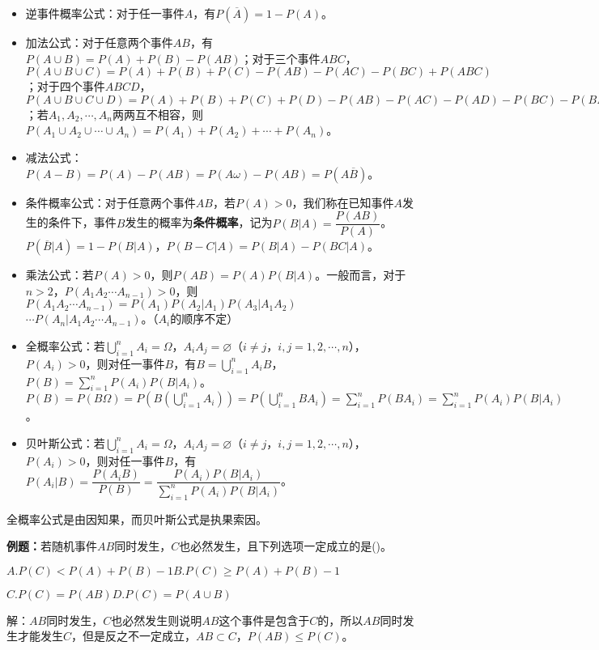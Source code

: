 \documentclass[UTF8, 12pt]{ctexart}
\begin{document}
\begin{itemize}
    \item 逆事件概率公式：对于任一事件$A$，有$P(\overline{A})=1-P(A)$。
    \item 加法公式：对于任意两个事件$AB$，有$P(A\cup B)=P(A)+P(B)-P(AB)$；对于三个事件$ABC$，$P(A\cup B\cup C)=P(A)+P(B)+P(C)-P(AB)-P(AC)-P(BC)+P(ABC)$；对于四个事件$ABCD$，$P(A\cup B\cup C\cup D)=P(A)+P(B)+P(C)+P(D)-P(AB)-P(AC)-P(AD)-P(BC)-P(BD)-P(CD)+P(ABC)+P(ABD)+P(ACD)+P(BCD)-P(ABCD)$；若$A_1,A_2,\cdots,A_n$两两互不相容，则$P(A_1\cup A_2\cup\cdots\cup A_n)=P(A_1)+P(A_2)+\cdots+P(A_n)$。
    \item 减法公式：$P(A-B)=P(A)-P(AB)=P(A\omega)-P(AB)=P(A\overline{B})$。
    \item 条件概率公式：对于任意两个事件$AB$，若$P(A)>0$，我们称在已知事件$A$发生的条件下，事件$B$发生的概率为\textbf{条件概率}，记为$P(B|A)=\dfrac{P(AB)}{P(A)}$。$P(\overline{B}|A)=1-P(B|A)$，$P(B-C|A)=P(B|A)-P(BC|A)$。
    \item 乘法公式：若$P(A)>0$，则$P(AB)=P(A)P(B|A)$。一般而言，对于$n>2$，$P(A_1A_2\cdots A_{n-1})>0$，则$P(A_1A_2\cdots A_{n-1})=P(A_1)P(A_2|A_1)P(A_3|A_1A_2)$\\$\cdots P(A_n|A_1A_2\cdots A_{n-1})$。（$A_i$的顺序不定）
    \item 全概率公式：若$\bigcup\limits_{i=1}^nA_i=\Omega$，$A_iA_j=\varnothing$（$i\neq j$，$i,j=1,2,\cdots,n$），$P(A_i)>0$，则对任一事件$B$，有$B=\bigcup\limits_{i=1}^nA_iB$，$P(B)=\sum\limits_{i=1}^nP(A_i)P(B|A_i)$。$P(B)=P(B\Omega)=P(B(\bigcup\limits_{i=1}^nA_i))=P(\bigcup\limits_{i=1}^nBA_i)=\sum\limits_{i=1}^nP(BA_i)=\sum\limits_{i=1}^nP(A_i)P(B|A_i)$。
    \item 贝叶斯公式：若$\bigcup\limits_{i=1}^nA_i=\Omega$，$A_iA_j=\varnothing$（$i\neq j$，$i,j=1,2,\cdots,n$），$P(A_i)>0$，则对任一事件$B$，有$P(A_i|B)=\dfrac{P(A_iB)}{P(B)}=\dfrac{P(A_i)P(B|A_i)}{\sum\limits_{i=1}^nP(A_i)P(B|A_i)}$。
\end{itemize}

全概率公式是由因知果，而贝叶斯公式是执果索因。

\textbf{例题：}若随机事件$AB$同时发生，$C$也必然发生，且下列选项一定成立的是()。

$A.P(C)<P(A)+P(B)-1$\qquad$B.P(C)\geqslant P(A)+P(B)-1$

$C.P(C)=P(AB)$\qquad$D.P(C)=P(A\cup B)$

解：$AB$同时发生，$C$也必然发生则说明$AB$这个事件是包含于$C$的，所以$AB$同时发生才能发生$C$，但是反之不一定成立，$AB\subset C$，$P(AB)\leqslant P(C)$。
\end{document}
